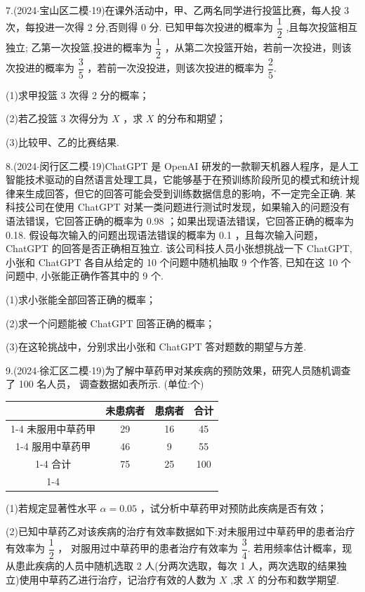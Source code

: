 7.(2024$\cdot$宝山区二模$\cdot$19)在课外活动中，甲、乙两名同学进行投篮比赛，每人投 3 次，每投进一次得 2 分,否则得 0 分. 已知甲每次投进的概率为 $\dfrac{1}{2}$ ,且每次投篮相互独立; 乙第一次投篮,投进的概率为 $\dfrac{1}{2}$ ，从第二次投篮开始，若前一次投进，则该次投进的概率为 $\dfrac{3}{5}$ ，若前一次没投进，则该次投进的概率为 $\dfrac{2}{5}$.

(1)求甲投篮 3 次得 2 分的概率；

(2)若乙投篮 3 次得分为 $X$ ，求 $X$ 的分布和期望；

(3)比较甲、乙的比赛结果.

8.(2024$\cdot$闵行区二模$\cdot$19)ChatGPT 是 OpenAI 研发的一款聊天机器人程序，是人工智能技术驱动的自然语言处理工具，它能够基于在预训练阶段所见的模式和统计规律来生成回答，但它的回答可能会受到训练数据信息的影响，不一定完全正确. 某科技公司在使用 ChatGPT 对某一类问题进行测试时发现，如果输入的问题没有语法错误，它回答正确的概率为 0.98 ；如果出现语法错误，它回答正确的概率为 0.18. 假设每次输入的问题出现语法错误的概率为 0.1 ，且每次输入问题， ChatGPT 的回答是否正确相互独立. 该公司科技人员小张想挑战一下 ChatGPT, 小张和 ChatGPT 各自从给定的 10 个问题中随机抽取 9 个作答, 已知在这 10 个问题中, 小张能正确作答其中的 9 个.

(1)求小张能全部回答正确的概率；

(2)求一个问题能被 ChatGPT 回答正确的概率；

(3)在这轮挑战中，分别求出小张和 ChatGPT 答对题数的期望与方差.

9.(2024$\cdot$徐汇区二模$\cdot$19)为了解中草药甲对某疾病的预防效果，研究人员随机调查了 100 名人员， 调查数据如表所示. (单位:个)

\begin{center}

\begin{tabular}{|c|c|c|c|}
\hline
\phantom{X} & 未患病者 & 患病者 & 合计 \\
\cline{1-4}
未服用中草药甲 & 29 & 16 & 45 \\
\cline{1-4}
服用中草药甲 & 46 & 9 & 55 \\
\cline{1-4}
合计 & 75 & 25 & 100 \\
\cline{1-4}
\hline
\end{tabular}
\end{center}

(1)若规定显著性水平 $\alpha  = {0.05}$ ，试分析中草药甲对预防此疾病是否有效；

(2)已知中草药乙对该疾病的治疗有效率数据如下:对未服用过中草药甲的患者治疗有效率为 $\dfrac{1}{2}$ ， 对服用过中草药甲的患者治疗有效率为 $\dfrac{3}{4}$. 若用频率估计概率，现从患此疾病的人员中随机选取 2 人(分两次选取，每次 1 人，两次选取的结果独立)使用中草药乙进行治疗，记治疗有效的人数为 $X$ ,求 $X$ 的分布和数学期望.

